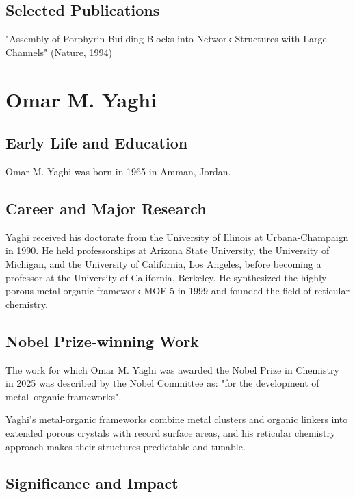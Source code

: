 \subsection*{Selected Publications}

"Assembly of Porphyrin Building Blocks into Network Structures with Large Channels" (Nature, 1994)

\clearpage

\section{Omar M. Yaghi}

\subsection*{Early Life and Education}

Omar M. Yaghi was born in 1965 in Amman, Jordan.

\subsection*{Career and Major Research}

Yaghi received his doctorate from the University of Illinois at Urbana-Champaign in 1990. He held professorships at Arizona State University, the University of Michigan, and the University of California, Los Angeles, before becoming a professor at the University of California, Berkeley. He synthesized the highly porous metal-organic framework MOF-5 in 1999 and founded the field of reticular chemistry.

\subsection*{Nobel Prize-winning Work}

The work for which Omar M. Yaghi was awarded the Nobel Prize in Chemistry in 2025 was described by the Nobel Committee as: "for the development of metal–organic frameworks".

Yaghi's metal-organic frameworks combine metal clusters and organic linkers into extended porous crystals with record surface areas, and his reticular chemistry approach makes their structures predictable and tunable.

\subsection*{Significance and Impact}

